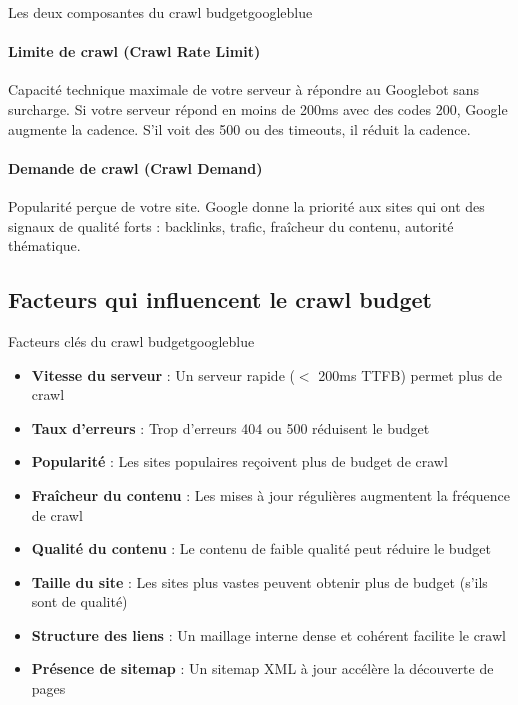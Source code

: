 \documentclass[12pt,a4paper,twoside]{report}
\begin{document}
\begin{mybox}{Les deux composantes du crawl budget}{googleblue}
\paragraph{Limite de crawl (Crawl Rate Limit)} Capacité technique maximale de votre serveur à répondre au Googlebot sans surcharge. Si votre serveur répond en moins de 200ms avec des codes 200, Google augmente la cadence. S'il voit des 500 ou des timeouts, il réduit la cadence.

\paragraph{Demande de crawl (Crawl Demand)} Popularité perçue de votre site. Google donne la priorité aux sites qui ont des signaux de qualité forts : backlinks, trafic, fraîcheur du contenu, autorité thématique.
\end{mybox}

\subsection{Facteurs qui influencent le crawl budget}

\begin{mybox}{Facteurs clés du crawl budget}{googleblue}
\begin{itemize}
    \item \textbf{Vitesse du serveur} : Un serveur rapide ($<$ 200ms TTFB) permet plus de crawl
    \item \textbf{Taux d'erreurs} : Trop d'erreurs 404 ou 500 réduisent le budget
    \item \textbf{Popularité} : Les sites populaires reçoivent plus de budget de crawl
    \item \textbf{Fraîcheur du contenu} : Les mises à jour régulières augmentent la fréquence de crawl
    \item \textbf{Qualité du contenu} : Le contenu de faible qualité peut réduire le budget
    \item \textbf{Taille du site} : Les sites plus vastes peuvent obtenir plus de budget (s'ils sont de qualité)
    \item \textbf{Structure des liens} : Un maillage interne dense et cohérent facilite le crawl
    \item \textbf{Présence de sitemap} : Un sitemap XML à jour accélère la découverte de pages
\end{itemize}
\end{mybox}
\end{document}
